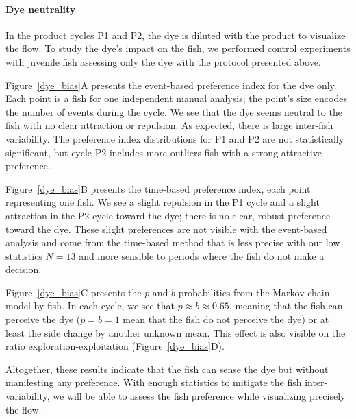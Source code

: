   \paragraph{Dye neutrality} In the product cycles P1 and P2, the dye is diluted with the product to visualize the flow. To study the dye's impact on the fish, we performed control experiments with juvenile fish assessing only the dye with the protocol presented above.

  Figure~\ref{dye_bias}A presents the event-based preference index for the dye only. Each point is a fish for one independent manual analysis; the point's size encodes the number of events during the cycle. We see that the dye seems neutral to the fish with no clear attraction or repulsion. As expected, there is large inter-fish variability. The preference index distributions for P1 and P2 are not statistically significant, but cycle P2 includes more outliers fish with a strong attractive preference.

  Figure~\ref{dye_bias}B presents the time-based preference index, each point representing one fish. We see a slight repulsion in the P1 cycle and a slight attraction in the P2 cycle toward the dye; there is no clear, robust preference toward the dye. These slight preferences are not visible with the event-based analysis and come from the time-based method that is less precise with our low statistics $N=13$ and more sensible to periods where the fish do not make a decision.

  Figure~\ref{dye_bias}C presents the $p$ and $b$ probabilities from the Markov chain model by fish. In each cycle, we see that $p \approx b \approx 0.65$, meaning that the fish can perceive the dye ($ p = b = 1$ mean that the fish do not perceive the dye) or at least the side change by another unknown mean. This effect is also visible on the ratio exploration-exploitation (Figure~\ref{dye_bias}D).

  Altogether, these results indicate that the fish can sense the dye but without manifesting any preference. With enough statistics to mitigate the fish inter-variability, we will be able to assess the fish preference while visualizing precisely the flow.


